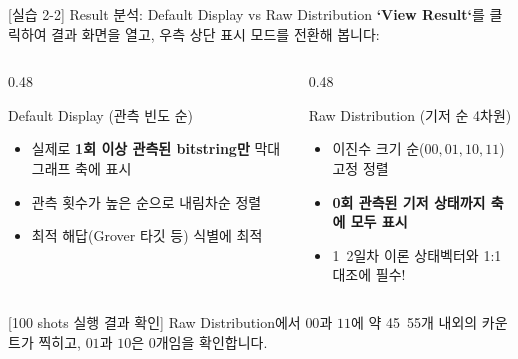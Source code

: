 \documentclass[aspectratio=169, 10pt]{beamer}
\begin{document}
\begin{frame}{[실습 2-2] Result 분석: Default Display vs Raw Distribution}
    \textbf{`View Result`}를 클릭하여 결과 화면을 열고, 우측 상단 표시 모드를 전환해 봅니다:
    \vspace{0.1cm}
    \begin{columns}[t]
        \begin{column}{0.48\textwidth}
            \begin{qcblock}{Default Display (관측 빈도 순)}
                \begin{itemize}
                    \item 실제로 \textbf{1회 이상 관측된 bitstring만} 막대그래프 축에 표시
                    \pause
                    \item 관측 횟수가 높은 순으로 내림차순 정렬
                    \pause
                    \item 최적 해답(Grover 타깃 등) 식별에 최적
                \end{itemize}
            \end{qcblock}
        \end{column}
        \begin{column}{0.48\textwidth}
            \begin{qcblock}{Raw Distribution (기저 순 4차원)}
                \begin{itemize}
                    \item 이진수 크기 순($00, 01, 10, 11$) 고정 정렬
                    \pause
                    \item \textbf{0회 관측된 기저 상태까지 축에 모두 표시}
                    \pause
                    \item 1~2일차 이론 상태벡터와 1:1 대조에 필수!
                \end{itemize}
            \end{qcblock}
        \end{column}
    \end{columns}
    \vspace{0.2cm}
    \begin{qctip}{[100 shots 실행 결과 확인]}
        Raw Distribution에서 $00$과 $11$에 약 45~55개 내외의 카운트가 찍히고, $01$과 $10$은 0개임을 확인합니다.
    \end{qctip}
\end{frame}
\end{document}

